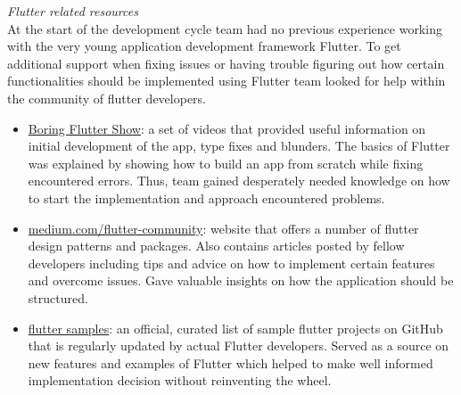 \documentclass{article}
\begin{document}
    
    
  
    \emph{Flutter related resources}\\
    At the start of the development cycle team had no previous experience working with the very young application development framework Flutter. To get additional support when fixing issues or having trouble figuring out how certain functionalities should be implemented using Flutter team looked for help within the community of flutter developers.\par
     \begin{itemize}    
     
        \item \href{https://www.youtube.com/watch?v=yr8F2S3Amas}{Boring Flutter Show}: a set of videos that provided useful information on initial development of the app, type fixes and blunders. The basics of Flutter was explained by showing how to build an app from scratch while fixing encountered errors. Thus, team gained desperately needed knowledge on how to start the implementation and approach encountered problems.
        
        \item \href{https://medium.com/flutter-community}{medium.com/flutter-community}: website that offers a number of flutter design patterns and packages. Also contains articles posted by fellow developers including tips and advice on how to implement certain features and overcome issues. Gave valuable insights on how the application should be structured.
        
        \item \href{https://github.com/flutter/samples}{flutter samples}: an official, curated list of sample flutter projects on GitHub that is regularly updated by actual Flutter developers. Served as a source on new features and examples of Flutter which helped to make well informed implementation decision without reinventing the wheel.
    \end{itemize}
   
\end{document}
